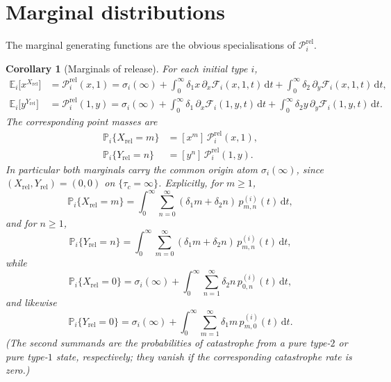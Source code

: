 \documentclass[11pt]{article}
\newcommand{\Prob}{\mathbb P}
\newcommand{\E}{\mathbb E}
\newcommand{\dd}{\mathrm d}
\newcommand{\Xrel}{X_{\mathrm{rel}}}
\newcommand{\Yrel}{Y_{\mathrm{rel}}}
\theoremstyle{plain}
\newtheorem{corollary}{Corollary}
\theoremstyle{definition}
\theoremstyle{remark}
\begin{document}
\section{Marginal distributions}

The marginal generating functions are the obvious specialisations of
$\mathcal P_i^{\mathrm{rel}}$.

\begin{corollary}[Marginals of release]
\label{cor:marginals}
For each initial type $i$,
\begin{align}
\E_i\bigl[x^{\Xrel}\bigr]
&=
\mathcal P_i^{\mathrm{rel}}(x,1)
=
\sigma_i(\infty)
+
\int_0^\infty
\delta_1 x\,\partial_x\mathcal F_i(x,1,t)\,
\dd t
+
\int_0^\infty
\delta_2\,\partial_y\mathcal F_i(x,1,t)\,
\dd t,
\label{eq:marg-X}
\\
\E_i\bigl[y^{\Yrel}\bigr]
&=
\mathcal P_i^{\mathrm{rel}}(1,y)
=
\sigma_i(\infty)
+
\int_0^\infty
\delta_1\,\partial_x\mathcal F_i(1,y,t)\,
\dd t
+
\int_0^\infty
\delta_2 y\,\partial_y\mathcal F_i(1,y,t)\,
\dd t.
\label{eq:marg-Y}
\end{align}
The corresponding point masses are
\begin{align}
\Prob_i\{\Xrel=m\}
&=
[x^m]\,\mathcal P_i^{\mathrm{rel}}(x,1),
\label{eq:marg-X-pmf}
\\
\Prob_i\{\Yrel=n\}
&=
[y^n]\,\mathcal P_i^{\mathrm{rel}}(1,y).
\label{eq:marg-Y-pmf}
\end{align}
In particular both marginals carry the common origin atom $\sigma_i(\infty)$, since
$(\Xrel,\Yrel)=(0,0)$ on $\{\tau_c=\infty\}$.
Explicitly, for $m\ge 1$,
\begin{equation}
\label{eq:marg-X-explicit}
\Prob_i\{\Xrel=m\}
=
\int_0^\infty
\sum_{n=0}^\infty
(\delta_1 m+\delta_2 n)\,
p_{m,n}^{(i)}(t)\,
\dd t,
\end{equation}
and for $n\ge 1$,
\begin{equation}
\label{eq:marg-Y-explicit}
\Prob_i\{\Yrel=n\}
=
\int_0^\infty
\sum_{m=0}^\infty
(\delta_1 m+\delta_2 n)\,
p_{m,n}^{(i)}(t)\,
\dd t,
\end{equation}
while
\begin{equation}
\label{eq:marg-origin}
\Prob_i\{\Xrel=0\}
=
\sigma_i(\infty)
+
\int_0^\infty
\sum_{n=1}^\infty
\delta_2 n\,
p_{0,n}^{(i)}(t)\,
\dd t,
\end{equation}
and likewise
\begin{equation}
\label{eq:marg-Y-zero}
\Prob_i\{\Yrel=0\}
=
\sigma_i(\infty)
+
\int_0^\infty
\sum_{m=1}^\infty
\delta_1 m\,
p_{m,0}^{(i)}(t)\,
\dd t.
\end{equation}
(The second summands are the probabilities of catastrophe from a pure type-$2$ or pure type-$1$
state, respectively; they vanish if the corresponding catastrophe rate is zero.)
\end{corollary}
\end{document}
